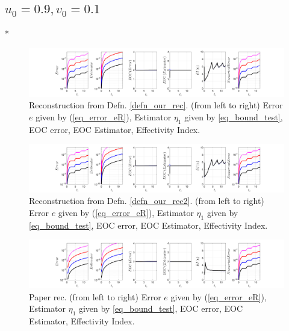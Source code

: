 \documentclass[12pt,a4paper]{article}
\numberwithin{equation}{section}
\theoremstyle{definition}
\begin{document}
\subsection*{$u_0=0.9, v_0= 0.1$}
\/*
\begin{figure}[H]
	\hspace{-3cm}
	\includegraphics[scale=0.55]{fig_LeapFrogplots_1x5_sin_IC_harmonic_order_2_u9_v1_rec_george}	
	\caption{Reconstruction from Defn. \ref{defn_our_rec}. (from left to right) Error $e$ given by (\ref{eq_error_eR}), Estimator $\eta_1$ given by \ref{eq_bound_test},  EOC error, EOC Estimator, Effectivity Index.}
	\label{fig_all_in_one_our_rec_george_u9_v1}
\end{figure}
\begin{figure}[H]
	\hspace{-3cm}
	\includegraphics[scale=0.55]{fig_LeapFrogplots_1x5_sin_IC_harmonic_order_2_u9_v1_rec2}	
	\caption{Reconstruction from Defn. \ref{defn_our_rec2}. (from left to right) Error $e$ given by (\ref{eq_error_eR}), Estimator $\eta_1$ given by \ref{eq_bound_test},  EOC error, EOC Estimator, Effectivity Index.}
	\label{fig_all_in_one_our_rec_2_u9_v1}
\end{figure}
\begin{figure}[H]
	\hspace{-3cm}
	\includegraphics[scale=0.55]{fig_LeapFrogplots_1x5_sin_IC_harmonic_u9_v1_paperrec}	
	\caption{Paper rec. (from left to right) Error $e$ given by (\ref{eq_error_eR}), Estimator $\eta_1$ given by \ref{eq_bound_test},   EOC error, EOC Estimator, Effectivity Index.}
	\label{fig_all_in_one_paperrec_u09_v01}
\end{figure}
\end{document}
